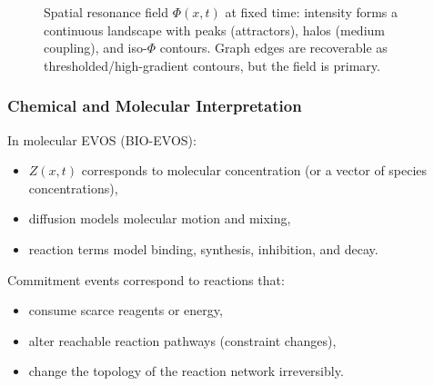 \documentclass[11pt]{article}
\begin{document}
\begin{figure}[h]
\caption{Spatial resonance field $\Phi(x,t)$ at fixed time: intensity forms a continuous landscape with peaks (attractors), halos (medium coupling), and iso-$\Phi$ contours. Graph edges are recoverable as thresholded/high-gradient contours, but the field is primary.}
\end{figure}

\subsubsection{Chemical and Molecular Interpretation}

In molecular EVOS (BIO-EVOS):
\begin{itemize}
  \item $Z(x,t)$ corresponds to molecular concentration (or a vector of species concentrations),
  \item diffusion models molecular motion and mixing,
  \item reaction terms model binding, synthesis, inhibition, and decay.
\end{itemize}

Commitment events correspond to reactions that:
\begin{itemize}
  \item consume scarce reagents or energy,
  \item alter reachable reaction pathways (constraint changes),
  \item change the topology of the reaction network irreversibly.
\end{itemize}
\end{document}
